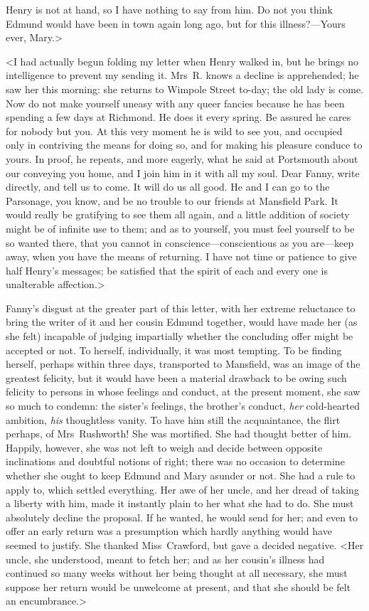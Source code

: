 Henry is not at hand, so I have nothing to say from him. Do not you think Edmund would have been in town again long ago, but for this illness?—Yours ever, Mary.>

<I had actually begun folding my letter when Henry walked in, but he brings no intelligence to prevent my sending it. Mrs~R. knows a decline is apprehended; he saw her this morning: she returns to Wimpole Street to-day; the old lady is come. Now do not make yourself uneasy with any queer fancies because he has been spending a few days at Richmond. He does it every spring. Be assured he cares for nobody but you. At this very moment he is wild to see you, and occupied only in contriving the means for doing so, and for making his pleasure conduce to yours. In proof, he repeats, and more eagerly, what he said at Portsmouth about our conveying you home, and I join him in it with all my soul. Dear Fanny, write directly, and tell us to come. It will do us all good. He and I can go to the Parsonage, you know, and be no trouble to our friends at Mansfield Park. It would really be gratifying to see them all again, and a little addition of society might be of infinite use to them; and as to yourself, you must feel yourself to be so wanted there, that you cannot in conscience—conscientious as you are—keep away, when you have the means of returning. I have not time or patience to give half Henry's messages; be satisfied that the spirit of each and every one is unalterable affection.>

Fanny's disgust at the greater part of this letter, with her extreme reluctance to bring the writer of it and her cousin Edmund together, would have made her (as she felt) incapable of judging impartially whether the concluding offer might be accepted or not. To herself, individually, it was most tempting. To be finding herself, perhaps within three days, transported to Mansfield, was an image of the greatest felicity, but it would have been a material drawback to be owing such felicity to persons in whose feelings and conduct, at the present moment, she saw so much to condemn: the sister's feelings, the brother's conduct, \textit{her}  cold-hearted ambition, \textit{his}  thoughtless vanity. To have him still the acquaintance, the flirt perhaps, of Mrs~Rushworth! She was mortified. She had thought better of him. Happily, however, she was not left to weigh and decide between opposite inclinations and doubtful notions of right; there was no occasion to determine whether she ought to keep Edmund and Mary asunder or not. She had a rule to apply to, which settled everything. Her awe of her uncle, and her dread of taking a liberty with him, made it instantly plain to her what she had to do. She must absolutely decline the proposal. If he wanted, he would send for her; and even to offer an early return was a presumption which hardly anything would have seemed to justify. She thanked Miss~Crawford, but gave a decided negative. <Her uncle, she understood, meant to fetch her; and as her cousin's illness had continued so many weeks without her being thought at all necessary, she must suppose her return would be unwelcome at present, and that she should be felt an encumbrance.>

